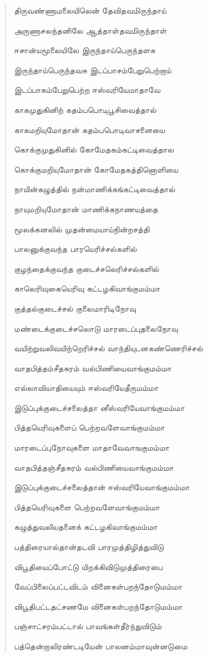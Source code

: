 \documentclass{article}
\begin{document}
\begin{quotation}
{திருவண்ணாமலையிலென் தேவிதவமிருந்தாய்

அருணாசலந்தனிலே ஆத்தாள்தவமிருந்தாள்

ஈசான்யமூலையிலே இருந்தாய்பெருந்தளசு

இருந்தாய்பெருந்தவசு இடப்பாசம்பேறுபெற்றாய்

இடப்பாகம்பேறுபெற்ற ஈஸ்வரியேமாதாவே

காகமுதுகினிற் கதம்பபொடிபூசிவைத்தால்

காகமறியுமோதான் கதம்பபொடிவாசனையை

கொக்குமுதுகினில் கோமேதகம்கட்டிவைத்தால

கொக்குமறியுமோதான் கோமேதகத்தினொளியை

நாயின்கழுத்தில்‌ நன்மாணிக்கங்கட்டிவைத்தால்  ‌

நாயுமறியுமோதான்‌ மாணிக்கநாணயத்தை

மூலக்கனலில் முதன்மையாய்நின்றசத்தி

பாலனுக்குவந்த பாரயெரிச்சல்களில்

குழந்தைக்குவந்த குடைச்சலெரிச்சல்களில்  ‌

காலெரிவுகையெரிவு கட்டழகிவாங்குமம்மா

குத்தல்குடைச்சல் குலைமாரிடிநோவு

மண்டைக்குடைச்சலொடு மாரடைப்புதலைநோவு

வயிற்றுவலிவயிற்றெரிச்சல்‌ வாந்தியுடனகண்ணெரிச்சல்

வாதபித்தம்‌சீதசுரம்‌ வல்பிணியைவாங்குமம்மா

எல்லாவியாதியையும்‌ ஈஸ்வரியேதீருமம்மா

இடுப்புக்குடைச்சலைத்தா னீஸ்வரியேவாங்குமம்மா

பித்தயெரிவுகளைப் பெற்றவளேவாங்குமம்மா

மாரடைப்புநோவுகளை மாதாவேவாஙகுமம்மா

வாதபித்தஞ்சீதசுரம்‌ வல்பிணியைவாங்குமம்மா

இடுப்புக்குடைச்சலைத்தான்‌ ஈஸ்வரியேவாங்குமம்மா

பித்தயெரிவுகளை பெற்றவளேவாங்குமம்மா

கழுத்துவலியதனைக் கட்டழகிவாங்குமம்மா

பத்திரையால்தான்தடவி பாரமுத்திழித்துவிடு

விபூதியைப்போட்டு யிறக்கிவிடுமுத்திரைபை

வேப்பிலைப்பட்டவிடம் வினைகள்பறந்தோடுமம்மா

விபூதிபட்டதட்சணமே வினைகள்பறந்தோடுமம்மா

பஞ்சாட்சரம்பட்டால் பாவங்கள்தீர்ந்துவிடும்

பத்தென்றாலிரண்டடியேன் பாலனம்மாவுன்னடுமை

}
\end{quotation}
\end{document}
